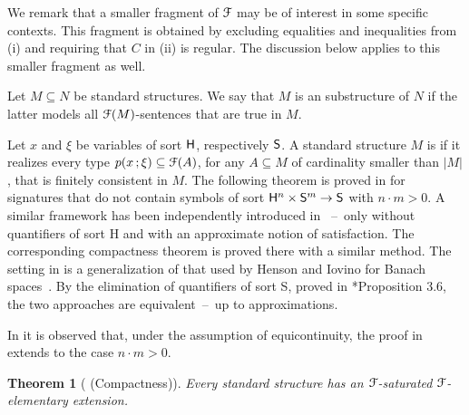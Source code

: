 \documentclass{amsproc}
\newcommand{\mylabel}[1]{{#1}\hfill}
\renewenvironment{itemize}
  {\begin{list}{$\triangleright$}{%
  \setlength{\parskip}{0mm}
  \setlength{\topsep}{.1\baselineskip}
  \setlength{\rightmargin}{0mm}
  \setlength{\listparindent}{0mm}
  \setlength{\itemindent}{0mm}
  \setlength{\labelwidth}{3ex}
  \setlength{\itemsep}{.1\baselineskip}
  \setlength{\parsep}{.1\baselineskip}
  \setlength{\partopsep}{0mm}
  \setlength{\labelsep}{1ex}
  \setlength{\leftmargin}{\labelwidth+\labelsep}
  \let\makelabel\mylabel}}{%
\end{list}}
\newcounter{thm}
\theoremstyle{mio}
\newtheorem{theorem}[thm]{Theorem}\tcolorboxenvironment{theorem}{mythm}
\renewcommand*{\emph}[1]{%
   \smash{\tikz[baseline]\node[rectangle, fill=teal!25, rounded corners, inner xsep=0.5ex, inner ysep=0.2ex, anchor=base, minimum height = 2.7ex]{\strut #1};}}
\begin{document}
We remark that a smaller fragment of ${\EuScript F}$ may be of interest in some specific contexts.
This fragment is obtained by excluding equalities and inequalities from (i) and requiring that $C$ in (ii) is regular.
The discussion below applies to this smaller fragment as well.

Let $M\subseteq N$ be standard structures.
We say that $M$ is an \emph{${\EuScript F}$-elementary\/} substructure of $N$ if the latter models all ${\EuScript F}(M)$-sentences that are true in $M$.

Let $x$ and $\xi$ be variables of sort ${\sf H}$, respectively ${\sf S}$.
A standard structure $M$ is \emph{${\EuScript F}$-saturated\/} if it realizes every type $p(x\,;\xi)\subseteq{\EuScript F}(A)$, for any $A\subseteq M$ of cardinality smaller than $|M|$, that is finitely consistent in $M$.
The following theorem is proved in \cite{clcl} for signatures that do not contain symbols of sort ${\sf H}^n\times{\sf S}^m\to {\sf S}$ with $n{\cdot}m>0$.
A similar framework has been independently introduced in \cite{CP}~--~only without quantifiers of sort {\sf H} and with an approximate notion of satisfaction.
The corresponding compactness theorem is proved there with a similar method.
The setting in \cite{CP} is a generalization of that used by Henson and Iovino for Banach spaces~\cite{HI}.
By the elimination of quantifiers of sort {\sf S}, proved in \cite{clcl}*{Proposition 3.6}, the two approaches are equivalent~--~up to approximations.

In \cite{Z} it is observed that, under the assumption of equicontinuity, the proof in \cite{clcl} extends to the case $n{\cdot}m> 0$.

\begin{theorem}[ (Compactness)]\label{thm_compactness}
  Every standard structure has an ${\EuScript F}$-saturated ${\EuScript F}$-elementary extension.
\end{theorem}


\end{document}
